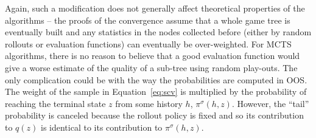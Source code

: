 Again, such a modification does not generally affect theoretical properties of the algorithms -- the proofs of the convergence assume that a whole game tree is eventually built and any statistics in the nodes collected before (either by random rollouts or evaluation functions) can eventually be over-weighted. For MCTS algorithms, there is no reason to believe that a good evaluation function would give a worse estimate of the quality of a sub-tree using random play-outs.
The only complication could be with the way the probabilities are computed in OOS. The weight of the sample in Equation~\ref{eq:scv} is multiplied by the probability of reaching the terminal state $z$ from some history $h$, $\pi^\sigma(h,z)$. However, the ``tail'' probability is canceled because the rollout policy is fixed and so its contribution to $q(z)$ is identical to its contribution to $\pi^\sigma(h,z)$.


